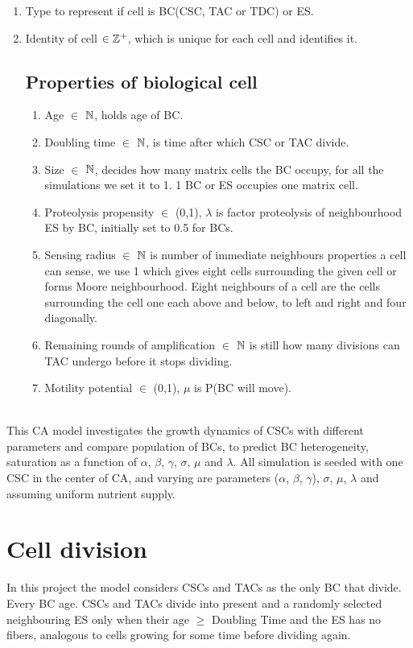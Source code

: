 \begin{enumerate}
 \item Type to represent if cell is BC(CSC, TAC or TDC) or ES.
 \item Identity of cell $ \in \mathbb{Z}^+ $, which is unique for each cell and identifies it.

 \subsection{Properties of biological cell}
 \begin{enumerate}
  \item Age $\in$ $\mathbb{N}$, holds age of BC. 
  \item Doubling time $\in$ $\mathbb{N}$, is time after which CSC or TAC divide.
  \item Size $\in$ $\mathbb{N}$, decides how many matrix cells the BC occupy, for all the simulations we set it to 1. 1 BC or ES occupies one matrix cell.
  \item Proteolysis propensity $\in$  (0,1), $\lambda$ is factor proteolysis of neighbourhood ES by BC, initially set to 0.5 for BCs.
  \item Sensing radius $\in$ $\mathbb{N}$ is number of immediate neighbours properties a cell can sense, we use 1 which gives eight cells surrounding the given cell or forms Moore neighbourhood.
  Eight neighbours of a cell are the cells surrounding the cell one each above and below, to left and right and four diagonally.
  \item Remaining rounds of amplification  $\in$ $\mathbb{N}$ is still how many divisions can TAC undergo before it stops dividing.
  \item Motility potential $\in$  (0,1), $\mu$ is P(BC will move).
 \end{enumerate}
 
\end{enumerate}

~\\This CA model investigates the growth dynamics of CSCs with different parameters and compare population of BCs, 
to predict BC heterogeneity, saturation as a function of $\alpha$, $\beta$, $\gamma$, $\sigma$, $\mu$ and $\lambda$.
All simulation is seeded with one CSC in the center of CA, and varying are parameters ($\alpha$, $\beta$, $\gamma$), 
$\sigma$,
$\mu$, 
$\lambda$ and assuming uniform nutrient supply.


\section{Cell division}
In this project the model considers CSCs and TACs as the only BC that divide. Every BC age. 
CSCs and TACs divide into present and a randomly selected neighbouring ES only when their age $\ge$ Doubling Time and the ES has no fibers,
analogous to cells growing for some time before dividing again.\\\

